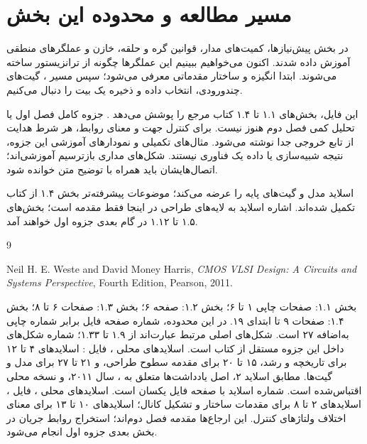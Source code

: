 \documentclass[12pt,a4paper]{article}
\newcommand{\secnum}[1]{\mbox{\beginL#1\endL}}
\begin{document}
\MakeAssignmentCover
\section*{مسیر مطالعه و محدوده این بخش}
در بخش پیش‌نیازها، کمیت‌های مدار، قوانین گره و حلقه، خازن و عملگرهای منطقی
آموزش داده شدند. اکنون می‌خواهیم ببینیم این عملگرها چگونه از ترانزیستور ساخته می‌شوند.
ابتدا انگیزه  و ساختار مقدماتی  معرفی می‌شود؛ سپس مسیر
، گیت‌های چندورودی، انتخاب داده و ذخیره یک بیت را دنبال می‌کنیم.

این فایل، بخش‌های \secnum{۱.۱} تا \secnum{۱.۴} کتاب مرجع را پوشش می‌دهد
\cite{weste}. جزوه کامل فصل اول یا تحلیل کمی فصل دوم هنوز نیست.
برای کنترل جهت و معنای روابط، هر شرط هدایت از تابع خروجی جدا نوشته می‌شود.
مثال‌های تکمیلی و نمودارهای آموزشی این جزوه، نتیجه شبیه‌سازی یا داده یک فناوری نیستند.
شکل‌های مداری بازترسیم آموزشی‌اند؛ اتصال‌هایشان باید همراه با توضیح متن خوانده شود.

اسلاید  مدل  و گیت‌های پایه را عرضه می‌کند؛
موضوعات پیشرفته‌تر بخش \secnum{۱.۴} از کتاب تکمیل شده‌اند.
اشاره اسلاید به لایه‌های طراحی در اینجا فقط مقدمه است؛ بخش‌های \secnum{۱.۵}
تا \secnum{۱.۱۲} در گام بعدی جزوه اول خواهند آمد.
\tableofcontents
\clearpage




\begin{thebibliography}{9}
\begin{latin}
Neil H. E. Weste and David Money Harris,
\textit{CMOS VLSI Design: A Circuits and Systems Perspective},
Fourth Edition, Pearson, 2011.
\end{latin}
بخش \secnum{۱.۱}: صفحات چاپی ۱ تا ۶؛ بخش \secnum{۱.۲}: صفحه ۶؛
بخش \secnum{۱.۳}: صفحات ۶ تا ۸؛ بخش \secnum{۱.۴}: صفحات ۹ تا ابتدای ۱۹.
در این محدوده، شماره صفحه فایل  برابر شماره چاپی به‌اضافه ۲۷ است.
شکل‌های اصلی مرتبط عبارت‌اند از \secnum{۱.۹} تا \secnum{۱.۳۳}؛
شماره شکل‌های داخل این جزوه مستقل از کتاب است.
اسلایدهای محلی ، فایل :
اسلایدهای ۴ تا ۱۲ برای تاریخچه و رشد، ۱۵ تا ۲۰ برای مقدمه سطوح طراحی،
و ۲۱ تا ۲۷ برای مدل  و گیت‌ها.
مطابق اسلاید ۲، اصل یادداشت‌ها متعلق به ، سال ۲۰۱۱،
و نسخه محلی اقتباس‌شده است. شماره اسلاید با صفحه فایل یکسان است.
اسلایدهای محلی ، فایل ،
اسلایدهای ۲ تا ۸ برای مقدمات ساختار و تشکیل کانال؛
اسلایدهای ۱۰ تا ۱۳ برای معنای اختلاف ولتاژهای کنترل.
این ارجاع‌ها مقدمه فصل دوم‌اند؛ استخراج روابط جریان در بخش بعدی جزوه اول انجام می‌شود.
\end{thebibliography}
\end{document}
